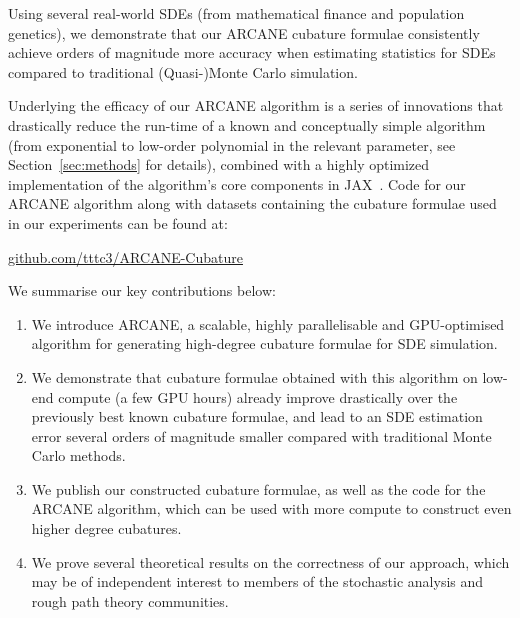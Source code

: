 \documentclass[11pt, letterpaper]{article}
\theoremstyle{definition}
\theoremstyle{remark}
\newcommand{\short}{ARCANE\xspace}
\begin{document}
Using several real-world SDEs (from mathematical finance and population genetics), we demonstrate that our \short cubature formulae consistently achieve orders of magnitude more accuracy when estimating statistics for SDEs compared to traditional (Quasi-)Monte Carlo simulation. 

Underlying the efficacy of our \short algorithm is a series of innovations that drastically reduce the run-time of a known and conceptually simple algorithm (from exponential to low-order polynomial in the relevant parameter, see Section~\ref{sec:methods} for details), combined with a highly optimized implementation of the algorithm's core components in JAX~\cite{jax2018github}.
Code for our \short algorithm along with datasets containing the cubature formulae used in our experiments can be found at:
\vspace{-1mm}
\begin{center}
\href{https://github.com/tttc3/ARCANE-Cubature}{github.com/tttc3/ARCANE-Cubature}
\end{center}
\vspace{-1mm}

We summarise our key contributions below:
\begin{enumerate}
    \item[(1)] We introduce \short, a scalable, highly parallelisable and GPU-optimised algorithm for generating high-degree cubature formulae for SDE simulation.\smallskip
    \item[(2)] We demonstrate that cubature formulae obtained with this algorithm on low-end compute (a few GPU hours) already improve drastically over the previously best known cubature formulae, and lead to an SDE estimation error several orders of magnitude smaller compared with traditional Monte Carlo methods.\smallskip
    \item[(3)] We publish our constructed cubature formulae, as well as the code for the \short algorithm, which can be used with more compute to construct even higher degree cubatures.\smallskip
    \item[(4)] We prove several theoretical results on the correctness of our approach, which may be of independent interest to members of the stochastic analysis and rough path theory communities.\vfill
\end{enumerate}
 
\end{document}
